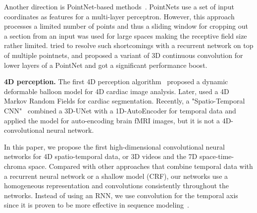Another direction is PointNet-based methods~\cite{pointnet, pointnetpp}. PointNets use a set of input coordinates as features for a multi-layer perceptron. However, this approach processes a limited number of points and thus a sliding window for cropping out a section from an input was used for large spaces making the receptive field size rather limited. \cite{superpoint} tried to resolve such shortcomings with a recurrent network on top of multiple pointnets, and \cite{pointcnn} proposed a variant of 3D continuous convolution for lower layers of a PointNet and got a significant performance boost.

\textbf{4D perception.}
The first 4D perception algorithm~\cite{4dseg95} proposed a dynamic deformable balloon model for 4D cardiac image analysis. Later, \cite{4dmrf} used a 4D Markov Random Fields for cardiac segmentation. Recently, a "Spatio-Temporal CNN"~\cite{stcnn} combined a 3D-UNet with a 1D-AutoEncoder for temporal data and applied the model for auto-encoding brain fMRI images, but it is not a 4D-convolutional neural network.

In this paper, we propose the first high-dimensional convolutional neural networks for 4D spatio-temporal data, or 3D videos and the 7D space-time-chroma space. Compared with other approaches that combine temporal data with a recurrent neural network or a shallow model (CRF), our networks use a homogeneous representation and convolutions consistently throughout the networks. Instead of using an RNN, we use convolution for the temporal axis since it is proven to be more effective in sequence modeling~\cite{bai2018empirical}.

